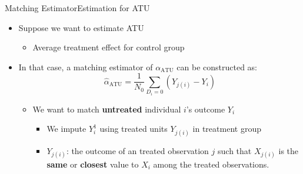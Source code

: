 \documentclass[dvipsnames,hyperref={pdfpagelabels=false}]{beamer}
\begin{document}
\begin{frame}{Matching Estimator}{Estimation for ATU}
	\begin{itemize}
		
		\item Suppose we want to estimate ATU 
				\vspace{0.3cm}
			\begin{itemize}
		\item Average treatment effect for control group
		
				\end{itemize}
		\vspace{0.3cm}
		\item In that case, a matching estimator of $\alpha_{\text{ATU}}$ can be constructed as:
		\begin{equation*}
		\hat{\alpha}_{\text{ATU}}=\dfrac{1}{N_0}\sum_{D_i=0}(Y_{j(i)}-Y_i)
		\end{equation*}
		
		\begin{itemize}
			
			\item We want to match \textbf{untreated} individual $i$'s outcome $Y_i$
					\vspace{0.3cm}
							\begin{itemize}
			\item We impute $Y^{1}_{i}$ using treated units $Y_{j(i)}$ in treatment group	
								\vspace{0.3cm}	
			\item $Y_{j(i)}$: the outcome of an treated observation $j$ such that $X_{j(i)}$ is the \textbf{same} or \textbf{closest} value to $X_i$ among the treated observations. 
					\end{itemize}
		\end{itemize}
		
	\end{itemize}
\end{frame}
\end{document}
